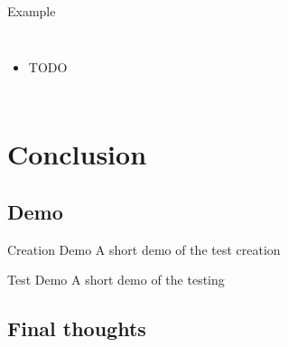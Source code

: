 \documentclass[12pt,ucs,hyperref={pdftext}]{beamer}
\newlength{\columnleft}
\newlength{\columnright}
\begin{document}
\begin{frame}{Example}
\begin{columns}

\column{\columnleft}

\column{\columnright}
\begin{itemize}%
\item TODO
\end{itemize}

\end{columns}
\end{frame}


\section{Conclusion}

\subsection{Demo}

\begin{frame}{Creation Demo}
A short demo of the test creation
\end{frame}

\begin{frame}{Test Demo}
A short demo of the testing
\end{frame}


\subsection{Final thoughts}
\end{document}
